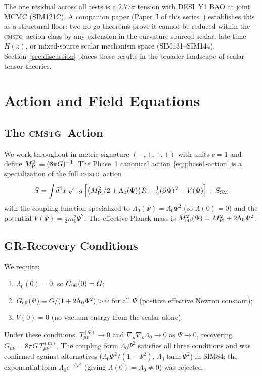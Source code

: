 \documentclass[12pt,a4paper]{article}
\newcommand{\CMSTG}{\textsc{cmstg}}
\newcommand{\Lz}{\Lambda_0}
\begin{document}
The one residual across all tests is a $2.77\sigma$ tension with DESI~Y1 BAO
at joint MCMC (SIM121C). A companion paper (Paper~I of this series~\cite{WilsonPaperI}) establishes
this as a structural floor: two no-go theorems prove it cannot be reduced within
the \CMSTG\ action class by any extension in the curvature-sourced scalar,
late-time $H(z)$, or mixed-source scalar mechanism space (SIM131--SIM144). Section~\ref{sec:discussion} places these
results in the broader landscape of scalar-tensor theories.

\section{Action and Field Equations}
\label{sec:action}

\subsection{The \CMSTG\ Action}

We work throughout in metric signature $(-,+,+,+)$ with units $c = 1$
and define $M_{\rm Pl}^2 \equiv (8\pi G)^{-1}$. The Phase~1 canonical
action~\eqref{eq:phase1-action} is a specialization of the full \CMSTG\ action
\begin{equation}
  S = \int\!d^4x\,\sqrt{-g}\,\Bigl[
    \bigl(M_{\rm Pl}^2/2 + \Lz(\Psi)\bigr)R
    - \tfrac{1}{2}(\partial\Psi)^2 - V(\Psi)
  \Bigr] + S_{\rm SM}
  \label{eq:full-action}
\end{equation}
with the coupling function specialized to $\Lz(\Psi) = \Lz\Psi^2$ (so
$\Lambda(0) = 0$) and the potential $V(\Psi) = \frac{1}{2}m_0^2\Psi^2$.
The effective Planck mass is
$M_{\rm eff}^2(\Psi) = M_{\rm Pl}^2 + 2\Lz\Psi^2$.

\subsection{GR-Recovery Conditions}
\label{sec:gr-recovery}

We require:
\begin{enumerate}
  \item $\Lz(0) = 0$, so $G_{\rm eff}(0) = G$;
  \item $G_{\rm eff}(\Psi) \equiv G/(1 + 2\Lz\Psi^2) > 0$ for all $\Psi$
        (positive effective Newton constant);
  \item $V(0) = 0$ (no vacuum energy from the scalar alone).
\end{enumerate}
Under these conditions, $T^{(\Psi)}_{\mu\nu} \to 0$ and
$\nabla_\mu\nabla_\nu\Lz \to 0$ as $\Psi \to 0$, recovering
$G_{\mu\nu} = 8\pi G\,T^{(\mathrm{m})}_{\mu\nu}$.
The coupling form $\Lz\Psi^2$ satisfies all three conditions and was confirmed
against alternatives ($\Lz\Psi^2/(1+\Psi^2)$, $\Lz\tanh\Psi^2$) in SIM84;
the exponential form $\Lz e^{-\beta\Psi^2}$ (giving $\Lambda(0) = \Lz \neq 0$)
was rejected.
\end{document}
